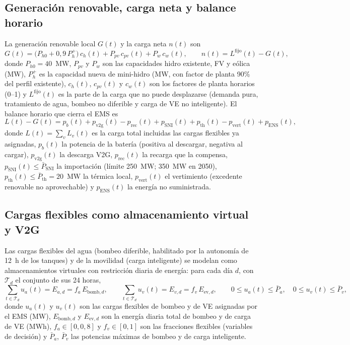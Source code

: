 \documentclass[11pt,a4paper]{article}
\begin{document}
\subsection{Generaci\'on renovable, carga neta y balance horario}
La generaci\'on renovable local $G(t)$ y la carga neta $n(t)$ son
\begin{equation}
G(t) = \big(P_{h0} + 0{,}9\,P_h^{+}\big)\,c_h(t) + P_{pv}\,c_{pv}(t) + P_w\,c_w(t), \qquad
n(t) = L^{\mathrm{fijo}}(t) - G(t),
\label{eq:G}
\end{equation}
donde $P_{h0}=40$~MW, $P_{pv}$ y $P_w$ son las capacidades hidro existente, FV y e\'olica
(MW), $P_h^{+}$ es la capacidad nueva de mini-hidro (MW, con factor de planta 90\% del
perfil existente), $c_h(t)$, $c_{pv}(t)$ y $c_w(t)$ son los factores de planta horarios
(0--1) y $L^{\mathrm{fijo}}(t)$ es la parte de la carga que no puede desplazarse
(demanda pura, tratamiento de agua, bombeo no diferible y carga de VE no inteligente).
El balance horario que cierra el EMS es
\begin{equation}
L(t) - G(t) = p_b(t) + p_{\mathrm{v2g}}(t) - p_{\mathrm{rec}}(t) + p_{\mathrm{SNI}}(t) + p_{\mathrm{th}}(t)
 - p_{\mathrm{vert}}(t) + p_{\mathrm{ENS}}(t),
\label{eq:balance}
\end{equation}
donde $L(t)=\sum_v L_v(t)$ es la carga total incluidas las cargas flexibles ya
asignadas, $p_b(t)$ la potencia de la bater\'ia (positiva al descargar, negativa al
cargar), $p_{\mathrm{v2g}}(t)$ la descarga V2G, $p_{\mathrm{rec}}(t)$ la recarga que la
compensa, $p_{\mathrm{SNI}}(t)\le\bar P_{\mathrm{SNI}}$ la importaci\'on (l\'imite
250~MW; 350~MW en 2050), $p_{\mathrm{th}}(t)\le\bar P_{\mathrm{th}}=20$~MW la t\'ermica
local, $p_{\mathrm{vert}}(t)$ el vertimiento (excedente renovable no aprovechable) y
$p_{\mathrm{ENS}}(t)$ la energ\'ia no suministrada.

\subsection{Cargas flexibles como almacenamiento virtual y V2G}
Las cargas flexibles del agua (bombeo diferible, habilitado por la autonom\'ia de 12~h de
los tanques) y de la movilidad (carga inteligente) se modelan como almacenamientos
virtuales con restricci\'on diaria de energ\'ia: para cada d\'ia $d$, con
$\mathcal{T}_d$ el conjunto de sus 24 horas,
\begin{equation}
\sum_{t\in\mathcal{T}_d} u_a(t) = E_{a,d} = f_a\,E_{\mathrm{bomb},d}, \qquad
\sum_{t\in\mathcal{T}_d} u_v(t) = E_{v,d} = f_v\,E_{\mathrm{ev},d}, \qquad
0\le u_a(t)\le\bar P_a,\quad 0\le u_v(t)\le\bar P_v,
\label{eq:flex}
\end{equation}
donde $u_a(t)$ y $u_v(t)$ son las cargas flexibles de bombeo y de VE asignadas por el
EMS (MW), $E_{\mathrm{bomb},d}$ y $E_{\mathrm{ev},d}$ son la energ\'ia diaria total de
bombeo y de carga de VE (MWh), $f_a\in[0,0{,}8]$ y $f_v\in[0,1]$ son las fracciones
flexibles (variables de decisi\'on) y $\bar P_a$, $\bar P_v$ las potencias m\'aximas de
bombeo y de carga inteligente.
\end{document}
